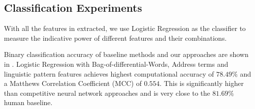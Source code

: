 \subsection{Classification Experiments}   
With all the features in  extracted, we use Logistic Regression as the 
classifier to measure the indicative power of different features and their combinations. 

Binary classification accuracy of baseline methods and our approaches are shown in . 
Logistic Regression with Bag-of-differential-Words, Address terms and linguistic pattern features 
achieves highest computational accuracy of $78.49\%$ and a Matthews Correlation Coefficient (MCC) of $0.554$.
This is significantly higher than competitive neural network approaches and is very close to the $81.69\%$ human baseline. 
                                                                  
